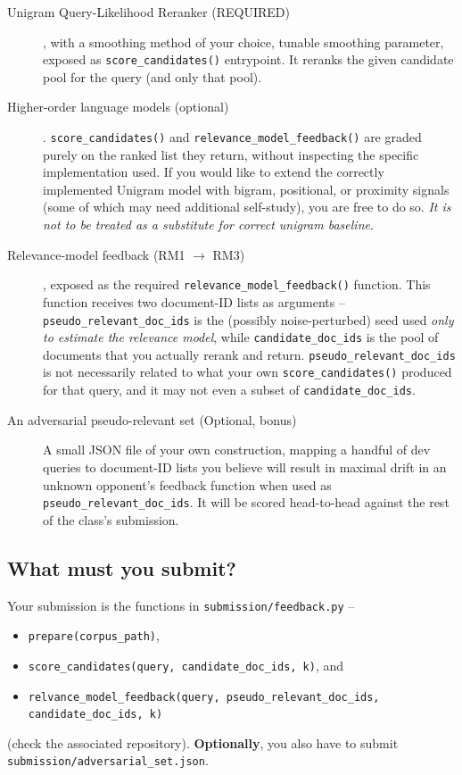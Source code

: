 \documentclass[10pt]{article}
\begin{document}
\begin{description}
	\item [Unigram Query-Likelihood Reranker (REQUIRED)], with a smoothing method of your choice, tunable smoothing parameter, exposed as \texttt{score\_candidates()} entrypoint. It reranks the given candidate pool for the query (and only that pool). 
	\item [Higher-order language models (optional)]. \texttt{score\_candidates()} and \texttt{relevance\_model\_feedback()} are graded purely on the ranked list they return, without inspecting the specific implementation used. If you would like to extend the correctly implemented Unigram model with bigram, positional, or proximity signals (some of which may need additional self-study), you are free to do so. \emph{It is not to be treated as a substitute for correct unigram baseline}.
	\item [Relevance-model feedback (RM1 $\rightarrow$ RM3)], exposed as the required \texttt{relevance\_model\_feedback()} function. This function receives two document-ID lists as arguments -- \texttt{pseudo\_relevant\_doc\_ids} is the (possibly noise-perturbed) seed used \emph{only to estimate the relevance model}, while \texttt{candidate\_doc\_ids} is the pool of documents that you actually rerank and return. \texttt{pseudo\_relevant\_doc\_ids} is not necessarily related to what your own \texttt{score\_candidates()} produced for that query, and it may not even a subset of \texttt{candidate\_doc\_ids}. 
	\item [An adversarial pseudo-relevant set (Optional, bonus)] A small JSON file of your own construction, mapping a handful of dev queries to document-ID lists you believe will result in maximal drift in an unknown opponent's feedback function when used as \texttt{pseudo\_relevant\_doc\_ids}. It will be scored head-to-head against the rest of the class's submission. 
\end{description}


\subsection{What must you submit?} 
Your submission is the functions in \texttt{submission/feedback.py} -- \begin{itemize}
\item \texttt{prepare(corpus\_path)}, 
\item \texttt{score\_candidates(query, candidate\_doc\_ids, k)}, and \item \texttt{relvance\_model\_feedback(query, pseudo\_relevant\_doc\_ids, candidate\_doc\_ids, k)}
\end{itemize} (check the associated repository). \textbf{Optionally}, you also have to submit  \texttt{submission/adversarial\_set.json}. 
\end{document}
